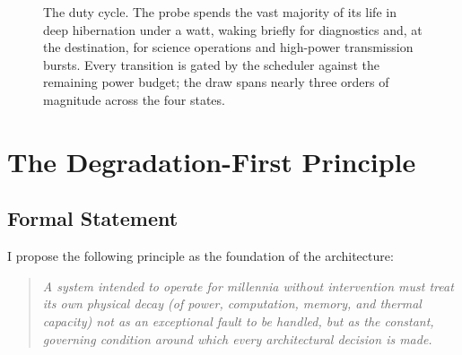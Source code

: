 \documentclass[10pt, a4paper]{article}
\begin{document}
\begin{figure}[ht]
\centering
{}
\caption{The duty cycle. The probe spends the vast majority of its life in deep hibernation under a watt, waking briefly for diagnostics and, at the destination, for science operations and high-power transmission bursts. Every transition is gated by the scheduler against the remaining power budget; the draw spans nearly three orders of magnitude across the four states.}
\label{fig:dutycycle}
\end{figure}

\section{The Degradation-First Principle}

\subsection{Formal Statement}

I propose the following principle as the foundation of the architecture:

\begin{quote}
\textit{A system intended to operate for millennia without intervention must treat its own physical decay (of power, computation, memory, and thermal capacity) not as an exceptional fault to be handled, but as the constant, governing condition around which every architectural decision is made.}
\end{quote}
\end{document}
